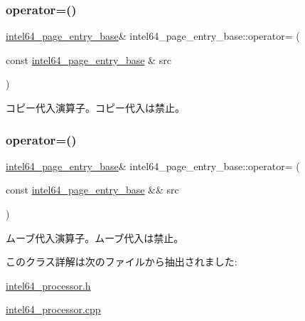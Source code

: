 \subsubsection{\texorpdfstring{operator=()}{operator=()}\hspace{0.1cm}{\footnotesize\ttfamily [1/2]}}
{\footnotesize\ttfamily \hyperlink{classintel64__page__entry__base}{intel64\+\_\+page\+\_\+entry\+\_\+base}\& intel64\+\_\+page\+\_\+entry\+\_\+base\+::operator= (\begin{DoxyParamCaption}\item[{const \hyperlink{classintel64__page__entry__base}{intel64\+\_\+page\+\_\+entry\+\_\+base} \&}]{src }\end{DoxyParamCaption})\hspace{0.3cm}{\ttfamily [delete]}}

コピー代入演算子。コピー代入は禁止。 \hypertarget{classintel64__page__entry__base_a4d369c95ee68ab21c0e56e3b82752b39}{}\label{classintel64__page__entry__base_a4d369c95ee68ab21c0e56e3b82752b39} 
\subsubsection{\texorpdfstring{operator=()}{operator=()}\hspace{0.1cm}{\footnotesize\ttfamily [2/2]}}
{\footnotesize\ttfamily \hyperlink{classintel64__page__entry__base}{intel64\+\_\+page\+\_\+entry\+\_\+base}\& intel64\+\_\+page\+\_\+entry\+\_\+base\+::operator= (\begin{DoxyParamCaption}\item[{const \hyperlink{classintel64__page__entry__base}{intel64\+\_\+page\+\_\+entry\+\_\+base} \&\&}]{src }\end{DoxyParamCaption})\hspace{0.3cm}{\ttfamily [delete]}}

ムーブ代入演算子。ムーブ代入は禁止。 

このクラス詳解は次のファイルから抽出されました\+:\begin{DoxyCompactItemize}
\item 
\hyperlink{intel64__processor_8h}{intel64\+\_\+processor.\+h}\item 
\hyperlink{intel64__processor_8cpp}{intel64\+\_\+processor.\+cpp}\end{DoxyCompactItemize}
